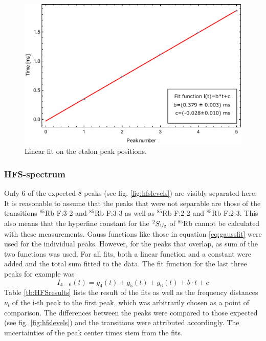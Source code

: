 \begin{figure}[htb]
\centering
\includegraphics[width=1.0\linewidth]{graphics/ethalon_linearfit}
\caption[Lienear fit on etalon peak positions]{Linear fit on the etalon peak positions.}
\label{fig:ethalon_linearfit}
\end{figure}

\subsubsection*{HFS-spectrum}
Only 6 of the expected 8 peaks (see fig. \ref{fig:hfslevels}) are visibly separated here. It is reasonable to assume that the peaks that were not separable are those of the transitions $^{85}$Rb F:3-2 and $^{85}$Rb F:3-3 as well as $^{85}$Rb F:2-2 and $^{85}$Rb F:2-3. This also means that the hyperfine constant for the $^2S_{\nicefrac{1}{2}}$ of $^{85}$Rb cannot be calculated with these measurements.
Gauss functions like those in equation \ref{eq:gaussfit} were used for the individual peaks. However, for the peaks that overlap, as sum of the two functions was used. For all fits, both a linear function and a constant were added and the total sum fitted to the data. The fit function for the last three peaks for example was
\begin{equation}
I_{4-6}(t)=g_4(t)+g_5(t)+g_6(t)+b\cdot t+c
\end{equation}
Table \ref{tb:HFSresults} lists the result of the fits as well as the frequency distances $\nu_{i}$ of the i-th peak to the first peak, which was arbitrarily chosen as a point of comparison. The differences between the peaks were compared to those expected (see fig. \ref{fig:hfslevels}) and the transitions were attributed accordingly. The uncertainties of the peak center times stem from the fits.\\

